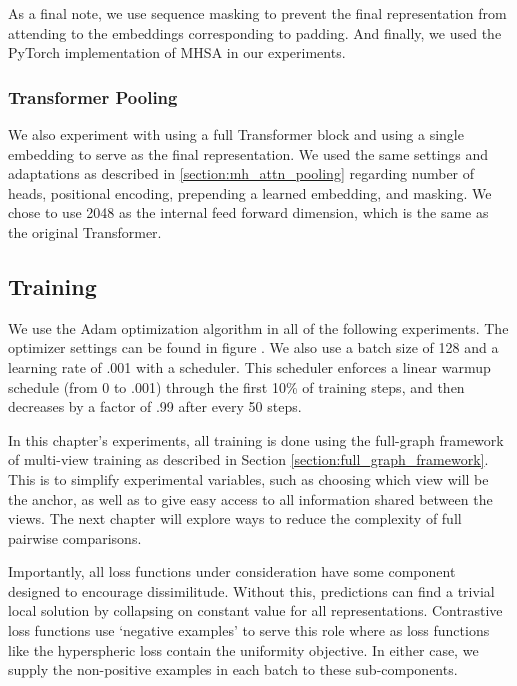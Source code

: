 As a final note, we use sequence masking to prevent the final representation from attending to the embeddings corresponding to padding.
And finally, we used the PyTorch implementation of MHSA in our experiments.

\subsubsection{Transformer Pooling}
\label{section:transformer_pooling}
We also experiment with using a full Transformer block and using a single embedding to serve as the final representation. 
We used the same settings and adaptations as described in \ref{section:mh_attn_pooling} regarding number of heads, positional encoding, prepending a learned embedding, and masking.
We chose to use 2048 as the internal feed forward dimension, which is the same as the original Transformer.

\subsection{Training}
\label{section:obj_exp_training}
We use the Adam optimization algorithm in all of the following experiments. 
The optimizer settings can be found in figure .
We also use a batch size of 128 and a learning rate of .001 with a scheduler. 
This scheduler enforces a linear warmup schedule (from 0 to .001) through the first 10\% of training steps, and then decreases by a factor of .99 after every 50 steps.

In this chapter's experiments, all training is done using the full-graph framework of multi-view training as described in Section \ref{section:full_graph_framework}.
This is to simplify experimental variables, such as choosing which view will be the anchor, as well as to give easy access to all information shared between the views.
The next chapter will explore ways to reduce the complexity of full pairwise comparisons.

Importantly, all loss functions under consideration have some component designed to encourage dissimilitude. 
Without this, predictions can find a trivial local solution by collapsing on constant value for all representations.
Contrastive loss functions use `negative examples' to serve this role where as loss functions like the hyperspheric loss contain the uniformity objective.
In either case, we supply the non-positive examples in each batch to these sub-components. 

